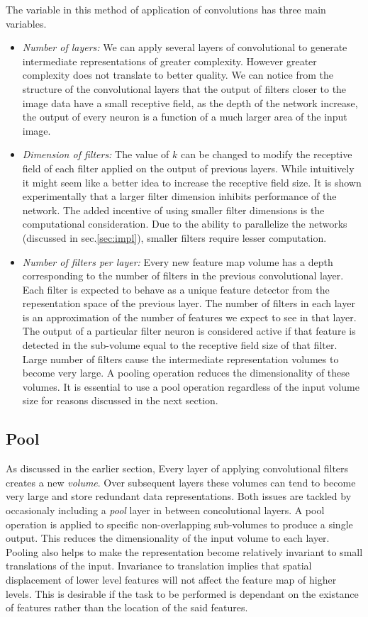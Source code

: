 The variable in this method of application of convolutions has three main variables.
\begin{itemize} \itemsep -2pt
\item \textit{Number of layers:} We can apply several layers of convolutional to generate intermediate representations of greater complexity. However greater complexity does not translate to better quality.  We can notice from the structure of the convolutional layers that the output of filters closer to the image data have a small receptive field, as the depth of the network increase, the output of every neuron is a function of a much larger area of the input image.
\item \textit{Dimension of filters:} The value of $k$ can be changed to modify the receptive field of each filter applied on the output of previous layers. While intuitively it might seem like a better idea to increase the receptive field size. It is shown experimentally that a larger filter dimension inhibits performance of the network. The added incentive of using smaller filter dimensions is the computational consideration. Due to the ability to parallelize the networks (discussed in sec.\ref{sec:impl}), smaller filters require lesser computation.
\item \textit{Number of filters per layer:} Every new feature map volume has a depth corresponding to the number of filters in the previous convolutional layer. Each filter is expected to behave as a unique feature detector from the repesentation space of the previous layer. The number of filters in each layer is an approximation of the number of features we expect to see in that layer. The output of a particular filter neuron is considered active if that feature is detected in the sub-volume equal to the receptive field size of that filter. Large number of filters cause the intermediate representation volumes to become very large. A pooling operation reduces the dimensionality of these volumes. It is essential to use a pool operation regardless of the input volume size for reasons discussed in the next section.
\end{itemize}

\subsection*{Pool}

As discussed in the earlier section, Every layer of applying convolutional filters creates a new \textit{volume}. Over subsequent layers these volumes can tend to become very large and store redundant data representations. Both issues are tackled by occasionaly including a \textit{pool} layer in between concolutional layers. A pool operation is applied to specific non-overlapping sub-volumes to produce a single output. This reduces the dimensionality of the input volume to each layer. Pooling also helps to make the representation become relatively invariant to small translations of the input. Invariance to translation implies that spatial displacement of lower level features will not affect the feature map of higher levels. This is desirable if the task to be performed is dependant on the existance of features rather than the location of the said features.


